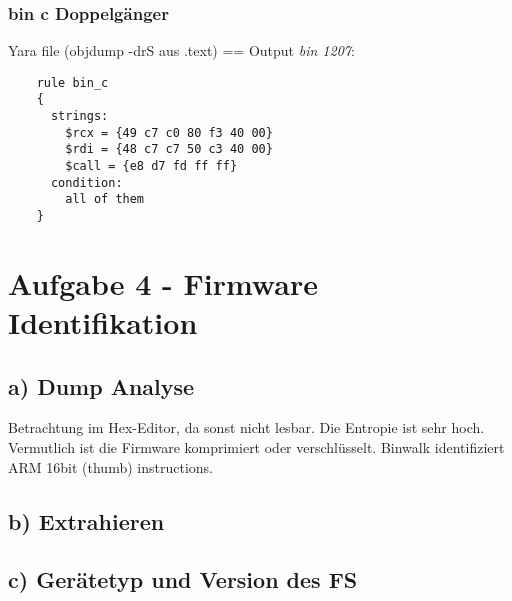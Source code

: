 \subsubsection*{bin c Doppelgänger}

Yara file (objdump -drS aus .text) == Output \textit{bin 1207}:

\begin{lstlisting}
    rule bin_c
    {
      strings:
        $rcx = {49 c7 c0 80 f3 40 00}
        $rdi = {48 c7 c7 50 c3 40 00}
        $call = {e8 d7 fd ff ff}
      condition:
        all of them
    }

\end{lstlisting}

\section*{Aufgabe 4 - Firmware Identifikation}

\subsection*{a) Dump Analyse}

Betrachtung im Hex-Editor, da sonst nicht lesbar.
Die Entropie ist sehr hoch. Vermutlich ist die Firmware komprimiert oder verschlüsselt.
Binwalk identifiziert ARM 16bit (thumb) instructions.

\subsection*{b) Extrahieren}


\subsection*{c) Gerätetyp und Version des FS}

